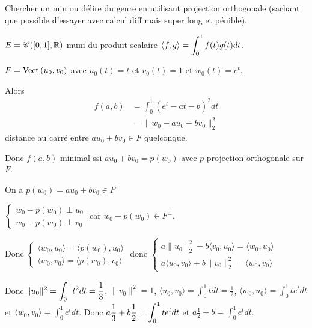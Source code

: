 \begin{exemple}
    Chercher un min ou délire du genre en utilisant projection orthogonale (sachant que possible
    d'essayer avec calcul diff mais super long et pénible).

    $E = \mathscr C([0, 1], \mathbb{R})$ muni du produit scalaire $\langle f, g \rangle = \displaystyle \int_0^1 f(t)g(t) dt$.

    $F = \operatorname{Vect} \, (u_0, v_0)$ avec $u_0(t) = t$ et $v_0(t) = 1$ et $w_0(t) = e^t$. 

    Alors 
    \begin{align}
        f(a, b) & = \int_0^1 (e^t -at - b)^2 dt \\
        & = \| w_0 - au_0 - bv_0 \|_2^2 
    \end{align}
    distance au carré entre $a u_0 + b v_0 \in F$ quelconque. 

    Donc $f(a, b)$ minimal ssi $au_0 + bv_0 = p(w_0)$ avec $p$ projection orthogonale sur 
    $F$. 

    On a $p(w_0) = a u_0 + b v_0 \in F$

    $\begin{cases}
        w_0 - p(w_0) \perp u_0 \\
        w_0 - p(w_0) \perp v_0
    \end{cases}$ 
    car $w_0 - p(w_0) \in F^\perp$.

    Donc $\begin{cases}
        \langle w_0, u_0 \rangle = \langle p(w_0), u_0 \rangle \\
        \langle w_0, v_0 \rangle = \langle p(w_0), v_0 \rangle
    \end{cases}$
    donc $\begin{cases}
        a \|u_0\|_2^2 + b \langle v_0, u_0 \rangle = \langle w_0, u_0 \rangle \\
        a \langle u_0, v_0 \rangle + b \|v_0\|_2^2 = \langle w_0, v_0 \rangle
    \end{cases}$

    Donc $\displaystyle \| u_0 \|^2 = \int_0^1 t^2 dt = \frac{1}{3}$, $\| v_0 \|^2 = 1$, $\langle u_0, v_0 \rangle = \int_0^1 t dt = \frac{1}{2}$, $\langle w_0, u_0 \rangle = \int_0^1 t e^t dt$ et $\langle w_0, v_0 \rangle = \int_0^1 e^t dt$.
    Donc $\displaystyle a \frac{1}{3} + b \frac{1}{2} = \int_0^1 t e^t dt$ et $a \frac{1}{2} + b = \int_0^1 e^t dt$.

\end{exemple}

